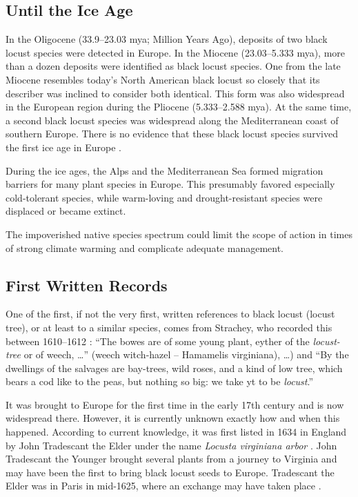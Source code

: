 \subsection{Until the Ice Age}

In the Oligocene (33.9–23.03 mya; Million Years Ago), deposits of two black locust species were detected in Europe. In the Miocene (23.03–5.333 mya), more than a dozen deposits were identified as black locust species. One from the late Miocene resembles today’s North American black locust so closely that its describer was inclined to consider both identical. This form was also widespread in the European region during the Pliocene (5.333–2.588 mya). At the same time, a second black locust species was widespread along the Mediterranean coast of southern Europe. There is no evidence that these black locust species survived the first ice age in Europe \citep{berry1918robinie}.

During the ice ages, the Alps and the Mediterranean Sea formed migration barriers for many plant species in Europe. This presumably favored especially cold-tolerant species, while warm-loving and drought-resistant species were displaced or became extinct.

The impoverished native species spectrum could limit the scope of action in times of strong climate warming and complicate adequate management.

\subsection{First Written Records}

One of the first, if not the very first, written references to black locust (locust tree), or at least to a similar species, comes from Strachey, who recorded this between 1610–1612 \citep{strachey1610-1612historie}: \enquote{The bowes are of some young plant, eyther of the \emph{locust-tree} or of weech, \dots} (weech witch-hazel -- Hamamelis virginiana), \dots) and \enquote{By the dwellings of the salvages are bay-trees, wild roses, and a kind of low tree, which bears a cod like to the peas, but nothing so big: we take yt to be \emph{locust}.}

It was brought to Europe for the first time in the early 17th century and is now widespread there. However, it is currently unknown exactly how and when this happened. According to current knowledge, it was first listed in 1634 in England by John Tradescant the Elder under the name \emph{Locusta virginiana arbor} \citep[p.~339]{gunther1922botanists}. John Tradescant the Younger brought several plants from a journey to Virginia and may have been the first to bring black locust seeds to Europe. Tradescant the Elder was in Paris in mid-1625, where an exchange may have taken place \citep{ginter2022robinieGeschichte}.

